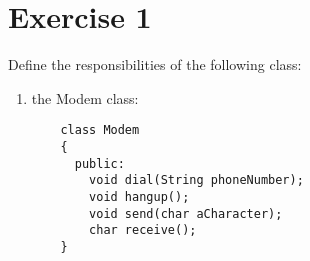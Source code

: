\documentclass[12pt]{article}
\begin{document}
\section{Exercise 1}
Define the responsibilities of the following class:\\
\begin{enumerate}
\item the Modem class:\\
  \begin{lstlisting}
    class Modem
    {
      public:
        void dial(String phoneNumber);
        void hangup();
        void send(char aCharacter);
        char receive();
    }
  \end{lstlisting}
\end{enumerate}
\end{document}
